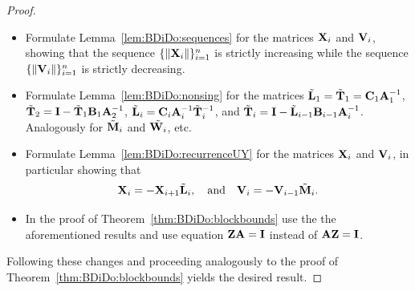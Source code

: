 \begin{subappendices}
\begin{proof}
\begin{itemize}
\item Formulate Lemma~\ref{lem:BDiDo:sequences} for the matrices $\mathbf{X}_i$ and
$\mathbf{V}_i$, showing that the sequence $\{\|\mathbf{X}_i\|\}_{i=1}^n$ is strictly increasing
while the sequence $\{\|\mathbf{V}_i\|\}_{i=1}^n$ is strictly decreasing.

\item Formulate Lemma~\ref{lem:BDiDo:nonsing} for the matrices
$\tilde{\mathbf{L}}_1=\tilde{\mathbf{T}}_1=\mathbf{C}_1\mathbf{A}_1^{-1}$, $\tilde{\mathbf{T}}_2=\mathbf{I}-\tilde{\mathbf{T}}_1\mathbf{B}_1\mathbf{A}_2^{-1}$,
$\tilde{\mathbf{L}}_i = \mathbf{C}_{i}\mathbf{A}_i^{-1}\tilde{\mathbf{T}}_i^{-1}$, and
$\tilde{\mathbf{T}}_i = \mathbf{I}-\tilde{\mathbf{L}}_{i-1}\mathbf{B}_{i-1}\mathbf{A}_i^{-1}$. Analogously for $\tilde{\mathbf{M}}_i$
and $\tilde{\mathbf{W}_i}$, etc.

\item Formulate Lemma~\ref{lem:BDiDo:recurrenceUY} for the matrices $\mathbf{X}_i$ and
$\mathbf{V}_i$, in particular showing that
$$
\mathbf{X}_i=-\mathbf{X}_{i+1}\tilde{\mathbf{L}}_i,\quad\mbox{and}\quad \mathbf{V}_i=-\mathbf{V}_{i-1}\tilde{\mathbf{M}}_i.
$$

\item In the proof of Theorem~\ref{thm:BDiDo:blockbounds} use the the
aforementioned results and use equation $\mathbf{Z}\mathbf{A}=\mathbf{I}$ instead of $\mathbf{A}\mathbf{Z}=\mathbf{I}$.
\end{itemize}
%
Following these changes and proceeding analogously to the proof
of Theorem~\ref{thm:BDiDo:blockbounds} yields the desired result.
\end{proof}

\end{subappendices}
\fi

